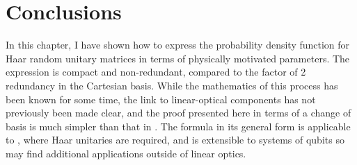 \section{Conclusions}
\label{sec:DDConclusions}
In this chapter, I have shown how to express the probability density function
for Haar random unitary matrices in terms of physically motivated parameters.
The expression is compact and non-redundant, compared to the factor of 2
redundancy in the Cartesian basis. While the mathematics of this process has
been known for some time, the link to linear-optical components has not
previously been made clear, and the proof presented here in terms of a change of
basis is much simpler than that in \cite{spengler2010}. The formula in its
general form is applicable to \bosonsampling{}, where Haar unitaries are
required, and is extensible to systems of qubits so may find additional
applications outside of linear optics.
